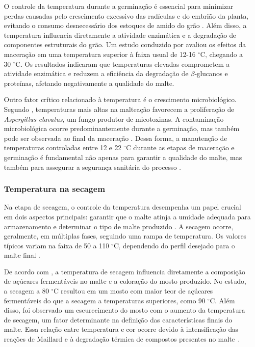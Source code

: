 O controle da temperatura durante a germinação é essencial para minimizar perdas causadas pelo crescimento excessivo das radículas e do embrião da planta, evitando o consumo desnecessário dos estoques de amido do grão \cite{PITZ1990, MALLETT2022}. Além disso, a temperatura influencia diretamente a atividade enzimática e a degradação de componentes estruturais do grão. Um estudo conduzido por  avaliou os efeitos da maceração em uma temperatura superior à faixa usual de 12-16 $^{\circ}$C, chegando a 30 $^{\circ}$C. Os resultados indicaram que temperaturas elevadas comprometem a atividade enzimática e reduzem a eficiência da degradação de $\beta$-glucanos e proteínas, afetando negativamente a qualidade do malte.

Outro fator crítico relacionado à temperatura é o crescimento microbiológico. Segundo , temperaturas mais altas na malteação favorecem a proliferação de \textit{Aspergillus clavatus}, um fungo produtor de micotoxinas. A contaminação microbiológica ocorre predominantemente durante a germinação, mas também pode ser observada ao final da maceração \cite{PETTERS1988}. Dessa forma, a manutenção de temperaturas controladas entre 12 e 22 $^{\circ}$C durante as etapas de maceração e germinação é fundamental não apenas para garantir a qualidade do malte, mas também para assegurar a segurança sanitária do processo \cite{TANGNI2002}.

\subsubsection{Temperatura na secagem}

Na etapa de secagem, o controle da temperatura desempenha um papel crucial em dois aspectos principais: garantir que o malte atinja a umidade adequada para armazenamento e determinar o tipo de malte produzido \cite{KUNZE1996}. A secagem ocorre, geralmente, em múltiplas fases, seguindo uma rampa de temperatura. Os valores típicos variam na faixa de 50 a 110 $^{\circ}$C, dependendo do perfil desejado para o malte final \cite{LEWIS2012}.

De acordo com , a temperatura de secagem influencia diretamente a composição de açúcares fermentáveis no malte e a coloração do mosto produzido. No estudo, a secagem a 80 $^{\circ}$C resultou em um mosto com maior teor de açúcares fermentáveis do que a secagem a temperaturas superiores, como 90 $^{\circ}$C. Além disso, foi observado um escurecimento do mosto com o aumento da temperatura de secagem, um fator determinante na definição das características finais do malte. Essa relação entre temperatura e cor ocorre devido à intensificação das reações de Maillard e à degradação térmica de compostos presentes no malte \cite{KUNZE1996}.


